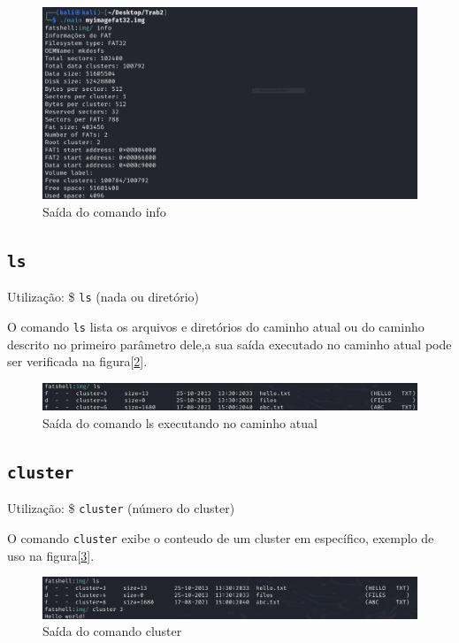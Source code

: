 \documentclass[
    12pt,				%
    oneside,   	        %
    a4paper,			%
    english,			%
    french,				%
    spanish,			%
    brazil,				%
    ]{pacotes/abntex2}
\begin{document}
\begin{figure}[H]
    \centering
    \includegraphics[width=450pt]{0-info.PNG}
    \caption{Saída do comando info}
    \label{fig:info}
\end{figure}


\subsection{\texttt{ls}}
\label{subsec:ls}
Utilização: \$ \texttt{ls} (nada ou diretório) 

O comando \texttt{ls} lista os arquivos e diretórios do caminho atual ou do caminho descrito no primeiro parâmetro dele,a sua saída executado no caminho atual pode ser verificada na figura[\ref{fig:ls}].

\begin{figure}[H]
    \centering
    \includegraphics[width=450pt]{figuras/resultados/1-ls.PNG}
    \caption{Saída do comando ls executando no caminho atual}
    \label{fig:ls}
\end{figure}


\subsection{\texttt{cluster}}
\label{subsec:cluster}
Utilização: \$ \texttt{cluster} (número do cluster)

O comando \texttt{cluster} exibe o conteudo de um cluster em específico, exemplo de uso na figura[\ref{fig:cluester}].

\begin{figure}[H]
    \centering
    \includegraphics[width=450pt]{figuras/resultados/2-cluster.PNG}
    \caption{Saída do comando cluster}
    \label{fig:cluester}
\end{figure}
\end{document}
